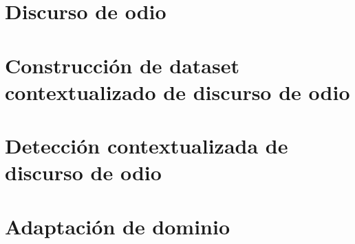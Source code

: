 
\chapter{Discurso de odio}

\label{app:04}


\chapter{Construcción de dataset contextualizado de discurso de odio}
\label{app:05}

\chapter{Detección contextualizada de discurso de odio}
\label{app:06}

\chapter{Adaptación de dominio}
\label{app:07}

